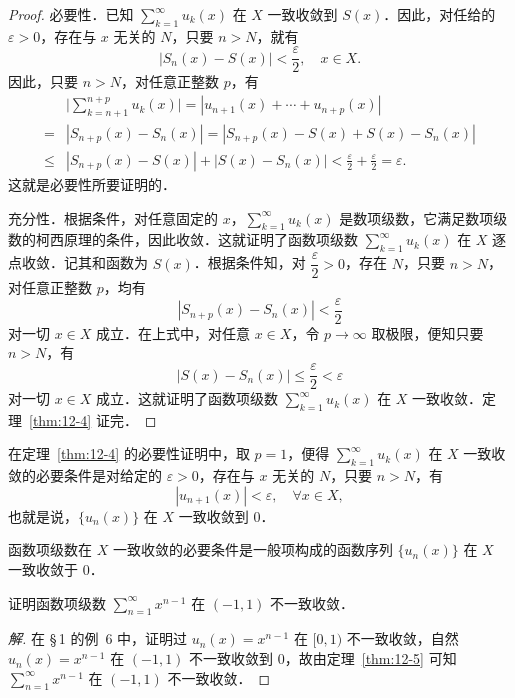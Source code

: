\begin{proof}
必要性．已知 $\displaystyle\sum_{k=1}^{\infty}u_{k}(x)$ 在 $X$ 一致收敛到 $S(x)$．因此，对任给的 $\varepsilon>0$，存在与 $x$ 无关的 $N$，只要 $n>N$，就有
\[
\left|S_{n}(x)-S(x)\right|<\frac{\varepsilon}{2},\quad x\in X.
\]
因此，只要 $n>N$，对任意正整数 $p$，有
\[
\begin{aligned}
&\Big|\sum_{k=n+1}^{n+p}u_{k}(x)\Big|=\left|u_{n+1}(x)+\cdots+u_{n+p}(x)\right|\\
={}&\left|S_{n+p}(x)-S_{n}(x)\right|=\left|S_{n+p}(x)-S(x)+S(x)-S_{n}(x)\right|\\
\leqslant{}&\left|S_{n+p}(x)-S(x)\right|+\left|S(x)-S_{n}(x)\right|<\frac{\varepsilon}{2}+\frac{\varepsilon}{2}=\varepsilon.
\end{aligned}
\]
这就是必要性所要证明的．

充分性．根据条件，对任意固定的 $x$，$\displaystyle\sum_{k=1}^{\infty}u_{k}(x)$ 是数项级数，它满足数项级数的柯西原理的条件，因此收敛．这就证明了函数项级数 $\displaystyle\sum_{k=1}^{\infty}u_{k}(x)$ 在 $X$ 逐点收敛．记其和函数为 $S(x)$．根据条件知，对 $\dfrac{\varepsilon}{2}>0$，存在 $N$，只要 $n>N$，对任意正整数 $p$，均有
\[
\left|S_{n+p}(x)-S_{n}(x)\right|<\frac{\varepsilon}{2}
\]
对一切 $x\in X$ 成立．在上式中，对任意 $x\in X$，令 $p\to\infty$ 取极限，便知只要 $n>N$，有
\[
\left|S(x)-S_{n}(x)\right|\leqslant\frac{\varepsilon}{2}<\varepsilon
\]
对一切 $x\in X$ 成立．这就证明了函数项级数 $\displaystyle\sum_{k=1}^{\infty}u_{k}(x)$ 在 $X$ 一致收敛．定理~\ref{thm:12-4} 证完．
\end{proof}

在定理~\ref{thm:12-4} 的必要性证明中，取 $p=1$，便得 $\displaystyle\sum_{k=1}^{\infty}u_{k}(x)$ 在 $X$ 一致收敛的必要条件是对给定的 $\varepsilon>0$，存在与 $x$ 无关的 $N$，只要 $n>N$，有
\[
\left|u_{n+1}(x)\right|<\varepsilon,\quad\forall x\in X,
\]
也就是说，$\{u_{n}(x)\}$ 在 $X$ 一致收敛到 $0$．

\begin{theorem}\label{thm:12-5}
函数项级数在 $X$ 一致收敛的必要条件是一般项构成的函数序列 $\{u_{n}(x)\}$ 在 $X$ 一致收敛于 $0$．
\end{theorem}

\begin{example}\label{ex:12-2-5}
证明函数项级数 $\displaystyle\sum_{n=1}^{\infty}x^{n-1}$ 在 $(-1,1)$ 不一致收敛．
\end{example}

\begin{proof}[解]
在 \S\,1 的例~6 中，证明过 $u_{n}(x)=x^{n-1}$ 在 $[0,1)$ 不一致收敛，自然 $u_{n}(x)=x^{n-1}$ 在 $(-1,1)$ 不一致收敛到 $0$，故由定理~\ref{thm:12-5} 可知 $\displaystyle\sum_{n=1}^{\infty}x^{n-1}$ 在 $(-1,1)$ 不一致收敛．
\end{proof}

